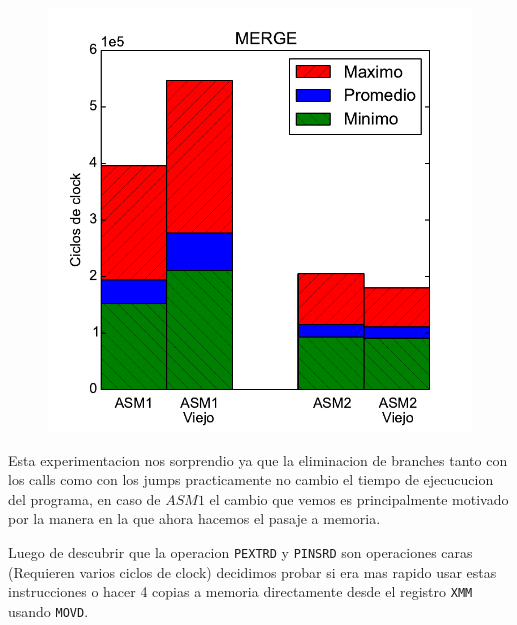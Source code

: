 \begin{figure}[h!]
	\centering
	\includegraphics[scale=0.45]{images/merge_comparationOLD}
\end{figure}

Esta experimentacion nos sorprendio ya que la eliminacion de branches tanto con los calls como con los jumps practicamente no cambio el tiempo de ejecucucion del programa, en caso de $ASM1$ el cambio que vemos es principalmente motivado por la manera en la que ahora hacemos el pasaje a memoria.

\newpage
Luego de descubrir que la operacion \texttt{PEXTRD} y \texttt{PINSRD} son operaciones caras (Requieren varios ciclos de clock) decidimos probar si era mas rapido usar estas instrucciones o hacer 4 copias a memoria directamente desde el registro \texttt{XMM} usando \texttt{MOVD}.

